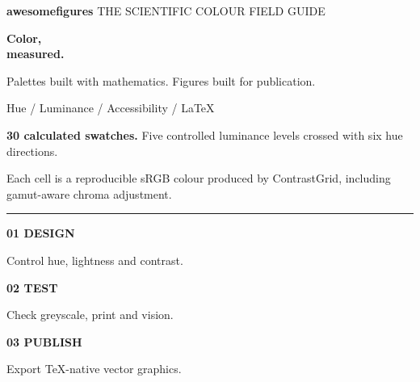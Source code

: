 \documentclass[10pt,twocolumn,a4paper]{article}
\begin{document}
\onecolumn
\begin{titlepage}
\pagecolor{CoverInk}
\color{white}
\thispagestyle{empty}
\vspace*{-1.40cm}
\noindent
{\sffamily\bfseries\large\textcolor{CoverOrange}{awesomefigures}}
\hfill{\sffamily\footnotesize\textcolor{CoverMuted}{THE SCIENTIFIC COLOUR FIELD GUIDE}}\par

\vspace{1.65cm}
\noindent
{\sffamily\bfseries\fontsize{45}{49}\selectfont
 Color,\\measured.\par}
\vspace{.45cm}
\noindent
{\sffamily\fontsize{15}{20}\selectfont\textcolor{CoverSoft}{
 Palettes built with mathematics. Figures built for publication.}\par}
\vspace{.30cm}
\noindent
{\sffamily\small\textcolor{CoverMuted}{
 Hue \quad / \quad Luminance \quad / \quad Accessibility \quad / \quad LaTeX}\par}

\vspace{1.15cm}
\par\noindent\makebox[\linewidth][c]{}\par

\vspace{.43cm}
\noindent
{\sffamily\small\textcolor{CoverSoft}{
 \textbf{30 calculated swatches.} Five controlled luminance levels
 crossed with six hue directions.}\par}
\vspace{.12cm}
\noindent
{\sffamily\footnotesize\textcolor{CoverMuted}{
 Each cell is a reproducible sRGB colour produced by ContrastGrid,
 including gamut-aware chroma adjustment.}\par}

\vfill
\noindent\textcolor{CoverMuted}{\rule{\linewidth}{.35pt}}\par
\vspace{.34cm}
\noindent
\begin{minipage}[t]{.30\linewidth}
 {\sffamily\bfseries\textcolor{CoverOrange}{01 \quad DESIGN}}\par
 {\sffamily\footnotesize\textcolor{CoverSoft}{Control hue, lightness and contrast.}}
\end{minipage}\hfill
\begin{minipage}[t]{.30\linewidth}
 {\sffamily\bfseries\textcolor{CoverOrange}{02 \quad TEST}}\par
 {\sffamily\footnotesize\textcolor{CoverSoft}{Check greyscale, print and vision.}}
\end{minipage}\hfill
\begin{minipage}[t]{.30\linewidth}
 {\sffamily\bfseries\textcolor{CoverOrange}{03 \quad PUBLISH}}\par
 {\sffamily\footnotesize\textcolor{CoverSoft}{Export TeX-native vector graphics.}}
\end{minipage}\par
\vspace{.42cm}


\end{titlepage}
\end{document}
